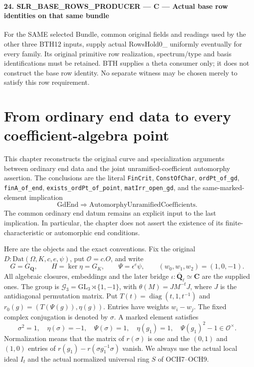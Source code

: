 \documentclass[11pt,a4paper]{article}
\numberwithin{equation}{section}
\theoremstyle{remark}\newtheorem{remark}[theorem]{Remark}
\begin{document}
\paragraph{24. SLR\_\allowbreak BASE\_\allowbreak ROWS\_\allowbreak PRODUCER — C — Actual base row identities on that same bundle}

For the SAME selected Bundle, common original fields and readings used by the other three BTH12 inputs, supply actual RowsHold0\_ uniformly eventually for every family. Its original primitive row realization, spectrum/type and basis identifications must be retained. BTH supplies a theta consumer only; it does not construct the base row identity. No separate witness may be chosen merely to satisfy this row requirement.



\clearpage
\section{From ordinary end data to every coefficient-algebra point}
\label{sec:unramified-coefficient-extension-v49}

This chapter reconstructs the original curve and specialization arguments
between ordinary end data and the joint unramified-coefficient automorphy
assertion.  The conclusions are the literal \texttt{Fin\allowbreak Crit},
\texttt{Const\allowbreak Of\allowbreak Char}, \texttt{ord\allowbreak Pt\_\allowbreak of\_\allowbreak gd},
\texttt{fin\allowbreak A\_\allowbreak of\_\allowbreak end}, \texttt{exists\_\allowbreak ord\allowbreak Pt\_\allowbreak of\_\allowbreak point},
\texttt{mat\allowbreak Irr\_\allowbreak open\_\allowbreak gd}, and the same-marked-element implication
\[
 \mathrm{GdEnd}\Rightarrow\mathrm{AutomorphyUnramifiedCoefficients}.
\]
The common ordinary end datum remains an explicit input to the last
implication.  In particular, the chapter does not assert the existence of
its finite-characteristic or automorphic end conditions.

Here are the objects and the exact conventions.  Fix the original
\(D:\mathrm{Dat}(\Omega,K,c,e,\psi)\), put
\(\mathcal O=c.O\), and write
\[
 G=G_{\mathbf Q},\qquad H=\ker\eta=G_K,\qquad
 \Psi=\epsilon^e\psi,\qquad (w_0,w_1,w_2)=(1,0,-1).
 \tag{UCE.1}
\]
All algebraic closures, embeddings and the later bridge
\(\iota:\overline{\mathbf Q}_\ell\simeq\mathbf C\) are the supplied
ones.  The group is
\(\mathcal G_3=\mathrm{GL}_3\rtimes\{1,-1\}\), with
\(\theta(M)=JM^{-t}J\), where \(J\) is the antidiagonal permutation
matrix.  Put \(T(t)=\operatorname{diag}(t,1,t^{-1})\) and
\(r_0(g)=(T(\Psi(g)),\eta(g))\).  Entries have weights
\(w_i-w_j\).  The fixed complex conjugation is denoted by \(\sigma\).
A marked element satisfies
\[
 \sigma^2=1,\quad \eta(\sigma)=-1,\quad \Psi(\sigma)=1,
 \quad\eta(g_1)=1,\quad \Psi(g_1)^2-1\in\mathcal O^\times.
 \tag{UCE.2}
\]
Normalization means that the matrix of \(r(\sigma)\) is one and the
\((0,1)\) and \((1,0)\) entries of
\(r(g_1)-r(\sigma g_1^{-1}\sigma)\) vanish.  We always use the actual
local ideal \(I_t\) and the actual normalized universal ring \(S\)
of OCH7--OCH9.
\end{document}

